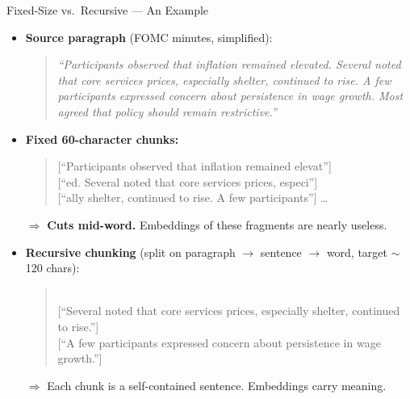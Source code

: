 \documentclass[10pt,english,aspectratio=169]{beamer}
\begin{document}
\begin{frame}{Fixed-Size vs.\ Recursive --- An Example}
\begin{itemize}
\item \textbf{Source paragraph} (FOMC minutes, simplified):
\begin{quote}
\small\itshape
``Participants observed that inflation remained elevated. Several noted that core services prices, especially shelter, continued to rise. A few participants expressed concern about persistence in wage growth. Most agreed that policy should remain restrictive.''
\end{quote}

\medskip
\item \textbf{Fixed 60-character chunks:}
\begin{quote}
\small\ttfamily
{[}``Participants observed that inflation remained elevat''] \\
{[}``ed. Several noted that core services prices, especi''] \\
{[}``ally shelter, continued to rise. A few participants''] \dots
\end{quote}
$\Rightarrow$ \textbf{Cuts mid-word.} Embeddings of these fragments are nearly useless.

\medskip
\item \textbf{Recursive chunking} (split on paragraph $\to$ sentence $\to$ word, target $\sim$120 chars):
\begin{quote}
\small{} \\
{[}``Several noted that core services prices, especially shelter, continued to rise.''] \\
{[}``A few participants expressed concern about persistence in wage growth.'']
\end{quote}
$\Rightarrow$ Each chunk is a self-contained sentence. Embeddings carry meaning.
\end{itemize}
\end{frame}
\end{document}
